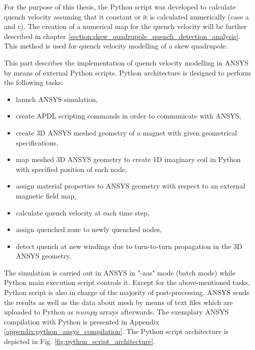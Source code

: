 
For the purpose of this thesis, the Python script was developed to calculate quench velocity assuming that it constant or it is calculated numerically (case a and c). The creation of a numerical map for the quench velocity will be further described in chapter \ref{section:skew_quadrupole_quench_detection_analysis}. This method is used for quench velocity modelling of a skew quadrupole.

This part describes the implementation of quench velocity modelling in ANSYS by means of external Python scripts. Python architecture is designed to perform the following tasks: 

\begin{itemize}
\item launch ANSYS simulation,
\item create APDL scripting commands in order to communicate with ANSYS,
\item create 3D ANSYS meshed geometry of a magnet with given geometrical specifications,
\item map meshed 3D ANSYS geometry to create 1D imaginary coil in Python with specified position of each node,
\item assign material properties to ANSYS geometry with respect to an external magnetic field map,
\item calculate quench velocity at each time step, 
\item assign quenched zone to newly quenched nodes,
\item detect quench at new windings due to turn-to-turn propagation in the 3D ANSYS geometry.
\end{itemize}
 
The simulation is carried out in ANSYS in "-aas" mode (batch mode) while Python main execution script controls it. Except for the above-mentioned tasks, Python script is also in charge of the majority of post-processing. ANSYS sends the results as well as the data about mesh by means of text files which are uploaded to Python as $numpy$ arrays afterwards. The exemplary ANSYS compilation with Python is presented in Appendix \ref{appendix:python_ansys_compilation}. The Python script architecture is depicted in Fig. \ref{fig:python_script_architecture}.

